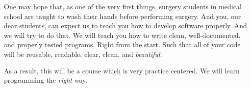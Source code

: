 One may hope that, as one of the very first things, surgery students in medical school are taught to wash their hands before performing surgery.
And you, our dear students, can expect us to teach you how to develop software properly.
And we will try to do that.
We will teach you how to write clean, well-documented, and properly tested programs.
Right from the start.
Such that all of your code will be reusable, readable, clear, clean, and \emph{beautiful}.

As a result, this will be a course which is very practice centered.
We will learn programming the \emph{right} way.%
\endhsection%
%
